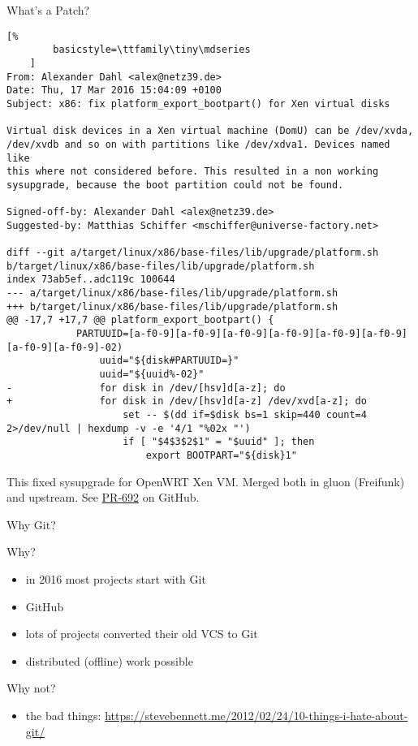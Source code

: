 \documentclass{beamer}
\begin{document}
\begin{frame}[fragile]{What's a Patch?}
    \begin{lstlisting}[%
        basicstyle=\ttfamily\tiny\mdseries
    ]
From: Alexander Dahl <alex@netz39.de>
Date: Thu, 17 Mar 2016 15:04:09 +0100
Subject: x86: fix platform_export_bootpart() for Xen virtual disks

Virtual disk devices in a Xen virtual machine (DomU) can be /dev/xvda,
/dev/xvdb and so on with partitions like /dev/xdva1. Devices named like
this where not considered before. This resulted in a non working
sysupgrade, because the boot partition could not be found.

Signed-off-by: Alexander Dahl <alex@netz39.de>
Suggested-by: Matthias Schiffer <mschiffer@universe-factory.net>

diff --git a/target/linux/x86/base-files/lib/upgrade/platform.sh b/target/linux/x86/base-files/lib/upgrade/platform.sh
index 73ab5ef..adc119c 100644
--- a/target/linux/x86/base-files/lib/upgrade/platform.sh
+++ b/target/linux/x86/base-files/lib/upgrade/platform.sh
@@ -17,7 +17,7 @@ platform_export_bootpart() {
            PARTUUID=[a-f0-9][a-f0-9][a-f0-9][a-f0-9][a-f0-9][a-f0-9][a-f0-9][a-f0-9]-02)
                uuid="${disk#PARTUUID=}"
                uuid="${uuid%-02}"
-               for disk in /dev/[hsv]d[a-z]; do
+               for disk in /dev/[hsv]d[a-z] /dev/xvd[a-z]; do
                    set -- $(dd if=$disk bs=1 skip=440 count=4 2>/dev/null | hexdump -v -e '4/1 "%02x "')
                    if [ "$4$3$2$1" = "$uuid" ]; then
                        export BOOTPART="${disk}1"
    \end{lstlisting}
    \pause
    This fixed sysupgrade for OpenWRT Xen VM. Merged both in gluon
    (Freifunk) and upstream.
    See \href{https://github.com/freifunk-gluon/gluon/pull/692}{PR-692}
    on GitHub.
\end{frame}

\begin{frame}{Why Git?}
    \begin{exampleblock}{Why?}
        \begin{itemize}
            \item in 2016 most projects start with Git
            \item GitHub
            \item lots of projects converted their old VCS to Git
            \item distributed (offline) work possible
        \end{itemize}
    \end{exampleblock}
    \pause
    \begin{alertblock}{Why not?}
        \begin{itemize}
            \item the bad things: \url{https://stevebennett.me/2012/02/24/10-things-i-hate-about-git/}
        \end{itemize}
    \end{alertblock}
\end{frame}
\end{document}
